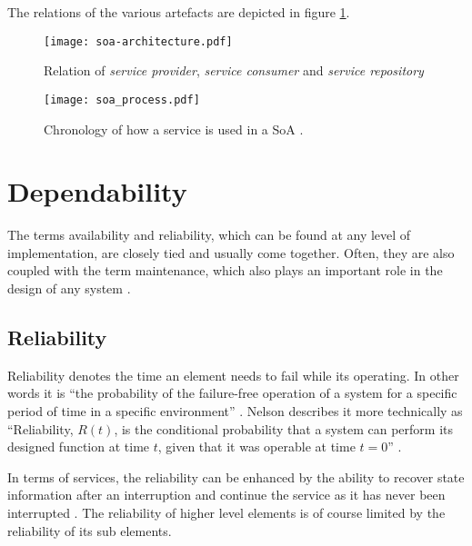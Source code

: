 The relations of the various artefacts are depicted in figure \ref{fig:soa_overview}.

\begin{figure}[!htbp]
\centering
\texttt{[image: soa-architecture.pdf]}
\caption{Relation of \emph{service provider}, \emph{service consumer} and \emph{service repository} \cite{arrowhead} \cite{converge}}
\label{fig:soa_overview}
\end{figure}

\begin{figure}[!htbp]
\centering
\texttt{[image: soa\_process.pdf]}
\caption{Chronology of how a service is used in a SoA \cite{converge}.}
\label{fig:service_cronology}
\end{figure}











\section{Dependability}

The terms availability and reliability, which can be found at any level of implementation, are closely tied and usually come together. Often, they are also coupled with the term maintenance, which also plays an important role in the design of any system \cite[p.116]{genesys} \cite{lessner}.

\subsection{Reliability}
\label{sec:reliability}

Reliability denotes the time an element needs to fail while its operating. In other words it is ``the probability of the failure-free operation of a system for a specific period of time in a specific environment'' \cite[p.116]{genesys}. Nelson describes it more technically as ``Reliability, $R(t)$, is the conditional probability that a system can perform its designed function at time $t$, given that it was operable at time $t=0$'' \cite{nelson}.

In terms of services, the reliability can be enhanced by the ability to recover state information after an interruption and continue the service as it has never been interrupted \cite{genesys}. The reliability of higher level elements is of course limited by the reliability of its sub elements.


